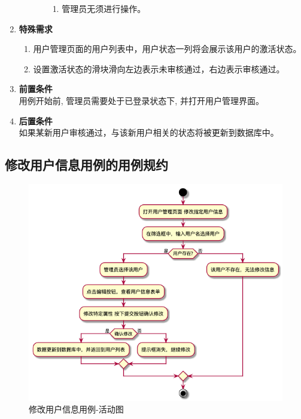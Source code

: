 \begin{enumerate}
\begin{enumerate}
\begin{enumerate}
            \begin{enumerate}
                \item 管理员无须进行操作。
            \end{enumerate}
        \end{enumerate}
    \end{enumerate}
    \item \textbf{特殊需求} 
    \begin{enumerate}
        \item 用户管理页面的用户列表中，用户状态一列将会展示该用户的激活状态。
        \item 设置激活状态的滑块滑向左边表示未审核通过，右边表示审核通过。
    \end{enumerate}
    \item \textbf{前置条件} \\ 用例开始前, 管理员需要处于已登录状态下, 并打开用户管理界面。
    \item \textbf{后置条件} \\ 如果某新用户审核通过，与该新用户相关的状态将被更新到数据库中。
\end{enumerate}



\subsection{修改用户信息用例的用例规约}

\begin{figure}[htp]
    \centering
    \includegraphics[width=16cm]{report/figure/usecase_v2/2_uc_admin_edit_user_info.png}
    \caption{修改用户信息用例-活动图}
    \label{fig:2_uc_admin_edit_user_info}
\end{figure}



